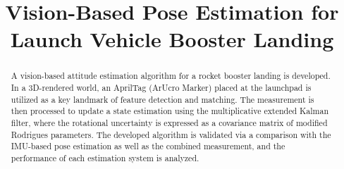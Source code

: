 \documentclass[conference]{IEEEtran}
\begin{document}
\title{Vision-Based Pose Estimation for Launch Vehicle Booster Landing\\
}

\author{
\and
{}
\and
{}
\and
{}
}

\maketitle

\begin{abstract}
A vision-based attitude estimation algorithm for a rocket booster landing is developed. 
In a 3D-rendered world, an AprilTag (ArUcro Marker) placed at the launchpad is utilized as a key landmark of feature detection and matching. 
The measurement is then processed to update a state estimation using the multiplicative extended Kalman filter, where the rotational uncertainty is expressed as a covariance matrix of modified Rodrigues parameters. 
The developed algorithm is validated via a comparison with the IMU-based pose estimation as well as the combined measurement, and the performance of each estimation system is analyzed.  
\end{abstract}

\end{document}
